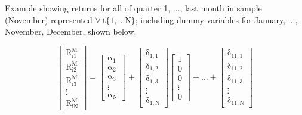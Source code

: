 \documentclass[11pt, english]{article}
\begin{document}
		Example showing returns for all of quarter 1, ..., last month in sample (November) represented $\mathrm{\forall\ t\{1,...N\}}$; including dummy variables for January, ..., November, December, shown below.

		$$\mathrm{
                \begin{bmatrix}
                        R_{i1}^M\\
                        R_{i2}^M\\
                        R_{i3}^M\\
                        \vdots\\
                        R_{iN}^M
                \end{bmatrix}=
                \begin{bmatrix}
                        \alpha_1\\
                        \alpha_2\\
                        \alpha_3\\
                        \vdots\\
                        \alpha_N
                \end{bmatrix}+
                \begin{bmatrix}
                        \delta_{1,1}\\
                        \delta_{1,2}\\
                        \delta_{1,3}\\
                        \vdots\\
                        \delta_{1,N}
                \end{bmatrix}
                \begin{bmatrix}
                        1\\
                        0\\
                        0\\
                        \vdots\\
                        0
                \end{bmatrix}+...+
                \begin{bmatrix}
                        \delta_{11,1}\\
                        \delta_{11,2}\\
                        \delta_{11,3}\\
                        \vdots\\
                        \delta_{11,N}
                \end{bmatrix}
}$$
\end{document}
